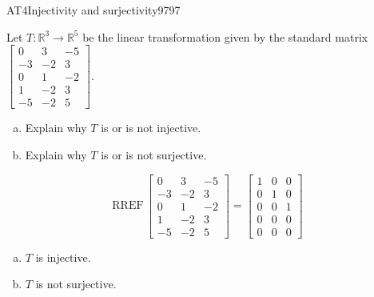 \begin{exercise}{AT4}{Injectivity and surjectivity}{9797} 
\begin{exerciseStatement} 

 Let \(T:\mathbb{R}^3 \to \mathbb{R}^5\) be the linear transformation given by the standard matrix \(\left[\begin{array}{ccc}
0 & 3 & -5 \\
-3 & -2 & 3 \\
0 & 1 & -2 \\
1 & -2 & 3 \\
-5 & -2 & 5
\end{array}\right]\). 

 

\begin{enumerate}[(a)]
\item 

Explain why \(T\) is or is not injective.


\item 

Explain why \(T\) is or is not surjective.


\end{enumerate}

     \end{exerciseStatement}
 \begin{exerciseAnswer} 

\[\mathrm{RREF}\,\left[\begin{array}{ccc}
0 & 3 & -5 \\
-3 & -2 & 3 \\
0 & 1 & -2 \\
1 & -2 & 3 \\
-5 & -2 & 5
\end{array}\right]=\left[\begin{array}{ccc}
1 & 0 & 0 \\
0 & 1 & 0 \\
0 & 0 & 1 \\
0 & 0 & 0 \\
0 & 0 & 0
\end{array}\right]\]

 

\begin{enumerate}[(a)]
\item  

\(T\) is injective.

 
\item  

\(T\) is not surjective.

 
\end{enumerate}

     \end{exerciseAnswer}
 \end{exercise}


